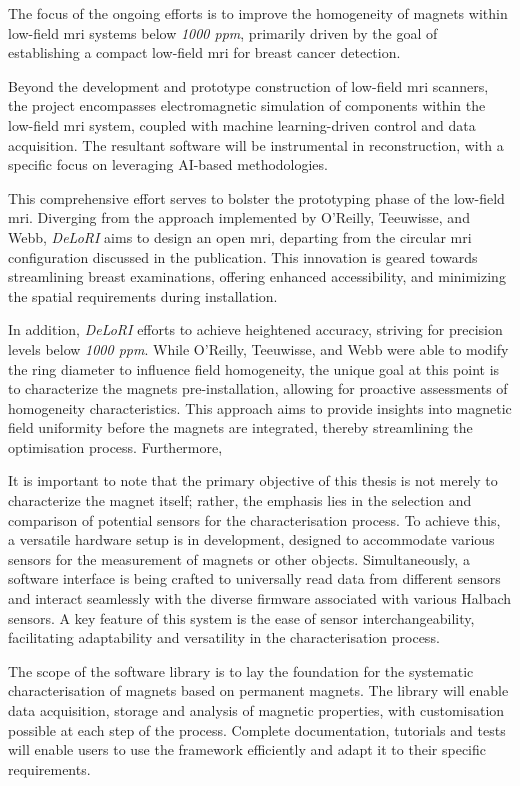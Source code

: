 The focus of the ongoing efforts is to improve the homogeneity of
magnets within low-field \gls{mri} systems below \emph{1000 \gls{ppm}},
primarily driven by the goal of establishing a compact low-field
\gls{mri} for breast cancer detection.

Beyond the development and prototype construction of low-field \gls{mri}
scanners, the project encompasses electromagnetic simulation of
components within the low-field \gls{mri} system, coupled with machine
learning-driven control and data acquisition. The resultant software
will be instrumental in reconstruction, with a specific focus on
leveraging AI-based methodologies.

This comprehensive effort serves to bolster the prototyping phase of the
low-field \gls{mri}. Diverging from the approach implemented by
O'Reilly, Teeuwisse, and Webb, \emph{DeLoRI} aims to design an open
\gls{mri}, departing from the circular \gls{mri} configuration discussed
in the publication. This innovation is geared towards streamlining
breast examinations, offering enhanced accessibility, and minimizing the
spatial requirements during installation.

In addition, \emph{DeLoRI} efforts to achieve heightened accuracy,
striving for precision levels below \emph{1000 \gls{ppm}}. While
O'Reilly, Teeuwisse, and Webb were able to modify the ring diameter to
influence field homogeneity, the unique goal at this point is to
characterize the magnets pre-installation, allowing for proactive
assessments of homogeneity characteristics. This approach aims to
provide insights into magnetic field uniformity before the magnets are
integrated, thereby streamlining the optimisation process. Furthermore,

\newpage

It is important to note that the primary objective of this thesis is not
merely to characterize the magnet itself; rather, the emphasis lies in
the selection and comparison of potential sensors for the
characterisation process. To achieve this, a versatile hardware setup is
in development, designed to accommodate various sensors for the
measurement of magnets or other objects. Simultaneously, a software
interface is being crafted to universally read data from different
sensors and interact seamlessly with the diverse firmware associated
with various Halbach sensors. A key feature of this system is the ease
of sensor interchangeability, facilitating adaptability and versatility
in the characterisation process.

The scope of the software library is to lay the foundation for the
systematic characterisation of magnets based on permanent magnets. The
library will enable data acquisition, storage and analysis of magnetic
properties, with customisation possible at each step of the process.
Complete documentation, tutorials and tests will enable users to use the
framework efficiently and adapt it to their specific requirements.

